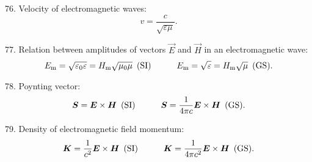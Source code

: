 76. Velocity of electromagnetic waves:
\begin{equation*}
	v = \frac{c}{\sqrt{\varepsilon\mu}}.
\end{equation*}

77. Relation between amplitudes of vectors $\vec{E}$ and $\vec{H}$ in an electromagnetic wave:
\begin{equation*}
	E_{\text{m}}=\sqrt{\varepsilon_0\varepsilon}=H_{\text{m}}\sqrt{\mu_0\mu} \,\,\,\text{(SI)}\quad\quad\quad E_{\text{m}}=\sqrt{\varepsilon}=H_{\text{m}}\sqrt{\mu} \,\,\,\text{(GS)}.
\end{equation*}

78. Poynting vector:
\begin{equation*}
	\boldsymbol{S} = \boldsymbol{E}\times\boldsymbol{H} \,\,\,\text{(SI)}\quad\quad\quad \boldsymbol{S} = \frac{1}{4\pi c}\boldsymbol{E}\times\boldsymbol{H} \,\,\,\text{(GS)}.
\end{equation*}

79. Density of electromagnetic field momentum:
\begin{equation*}
	\boldsymbol{K}=\frac{1}{c^2}\boldsymbol{E}\times\boldsymbol{H} \,\,\,\text{(SI)}\quad\quad\quad \boldsymbol{K}=\frac{1}{4\pi c^2}\boldsymbol{E}\times\boldsymbol{H} \,\,\,\text{(GS)}.
\end{equation*}
